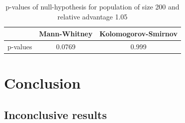 \documentclass{l4proj}
\begin{document}
\begin{table}[]
    \centering
    \begin{tabular}{|c|c|c|}
    \hline
    & Mann-Whitney & Kolomogorov-Smirnov \\ \hline
    p-values & 0.0769 & 0.999  \\ \hline
    \end{tabular}
    \caption{p-values of null-hypothesis for population of size 200 and relative advantage 1.05}
\end{table}


\chapter{Conclusion}\label{conclusion}

\section{Inconclusive results}
\end{document}
